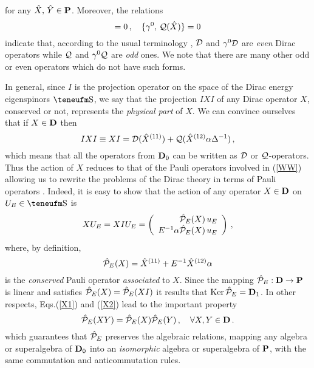 \documentclass[a4paper,12pt]{article}
\begin{document}
for any  $\hat X,\, \hat Y \in {\bf P}$. Moreover, the relations    
\begin{equation}
[\gamma^0,\, {\cal D}(\hat X)]=0\,, \quad
\{\gamma^0,\, {\cal Q}(\hat X)\}=0 
\end{equation}
indicate that, according to the usual terminology \cite{TH},   
${\cal D}$ and $\gamma^0{\cal D}$ are {\em even} Dirac operators while 
${\cal Q}$ and $\gamma^0{\cal Q}$ are {\em odd} ones. We note that there 
are many other odd or even operators which do not have such forms. 


In general, since $I$ is the projection operator on the space of the Dirac 
energy eigenspinors $\Eh$, we say that the projection $IXI$ of any Dirac 
operator $X$, conserved or not, represents the {\em physical part} of $X$. 
We can convince ourselves that if $X\in {\bf D}$ then
\begin{equation}\label{WW}
IXI\equiv XI={\cal D}(\hat X^{(11)})+{\cal Q}(\hat X^{(12)}\alpha 
\Delta^{-1})\,,
\end{equation}
which means that all the operators from ${\bf D}_{0}$ can be written as 
${\cal D}$ or ${\cal Q}$-operators. Thus the action of $X$ reduces to 
that of the Pauli operators involved in (\ref{WW}) allowing us to rewrite 
the problems of the Dirac theory in terms  of Pauli operators 
\cite{CV3,CV4}. Indeed, it is easy to show that the action of any  operator 
$X\in {\bf D}$ on $U_{E}\in \Eh$  is  
\begin{equation}\label{cue}
 XU_{E}=XIU_{E}=\left(
\begin{array}{r}
\hat{\cal P}_{E}(X)\,u_{E}\\
E^{-1}\alpha\hat{\cal P}_{E}(X)\,u_{E}
\end{array}\right)\,,
\end{equation}
where, by definition, 
\begin{equation}\label{PE}
\hat{\cal P}_{E}(X)=\hat X^{(11)}+ E^{-1}\hat X^{(12)}\alpha
\end{equation}
is the {\em conserved} Pauli operator {\em associated} to $X$. 
Since the mapping $\hat{\cal P}_{E}: {\bf D}\to {\bf P}$ is linear and 
satisfies  $\hat{\cal P}_{E}(X)=  \hat{\cal P}_{E}(XI)$  it results that 
${\rm Ker}\,\hat{\cal P}_{E}={\bf D}_{1}$. 
In other respects,  Eqs.(\ref{X1}) and (\ref{X2}) lead to 
the  important property
\begin{equation}
\hat{\cal P}_{E}(XY)=  \hat{\cal P}_{E}(X)\hat{\cal P}_{E}(Y)\,, \quad \forall 
X,Y\in {\bf D}\,.
\end{equation}
which guarantees  that  $\hat{\cal P}_{E}$ preserves  the algebraic 
relations, mapping any algebra or superalgebra of ${\bf D}_0$ into an 
{\em isomorphic} algebra or superalgebra of ${\bf P}$, with the same 
commutation and anticommutation rules.
\end{document}
